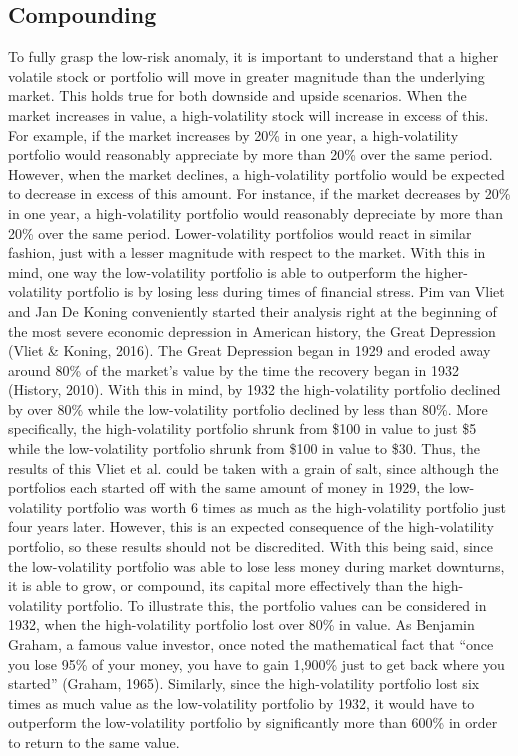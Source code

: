 \documentclass[12pt,twoside]{reedthesis}
\theoremstyle{definition}
\theoremstyle{definition}
\theoremstyle{definition}
\theoremstyle{remark}
\begin{document}
\subsection{Compounding}\label{compounding}

To fully grasp the low-risk anomaly, it is important to understand that
a higher volatile stock or portfolio will move in greater magnitude than
the underlying market. This holds true for both downside and upside
scenarios. When the market increases in value, a high-volatility stock
will increase in excess of this. For example, if the market increases by
20\% in one year, a high-volatility portfolio would reasonably
appreciate by more than 20\% over the same period. However, when the
market declines, a high-volatility portfolio would be expected to
decrease in excess of this amount. For instance, if the market decreases
by 20\% in one year, a high-volatility portfolio would reasonably
depreciate by more than 20\% over the same period. Lower-volatility
portfolios would react in similar fashion, just with a lesser magnitude
with respect to the market. With this in mind, one way the
low-volatility portfolio is able to outperform the higher-volatility
portfolio is by losing less during times of financial stress. Pim van
Vliet and Jan De Koning conveniently started their analysis right at the
beginning of the most severe economic depression in American history,
the Great Depression (Vliet \& Koning, 2016). The Great Depression began
in 1929 and eroded away around 80\% of the market's value by the time
the recovery began in 1932 (History, 2010). With this in mind, by 1932
the high-volatility portfolio declined by over 80\% while the
low-volatility portfolio declined by less than 80\%. More specifically,
the high-volatility portfolio shrunk from \$100 in value to just \$5
while the low-volatility portfolio shrunk from \$100 in value to \$30.
Thus, the results of this Vliet et al. could be taken with a grain of
salt, since although the portfolios each started off with the same
amount of money in 1929, the low-volatility portfolio was worth 6 times
as much as the high-volatility portfolio just four years later. However,
this is an expected consequence of the high-volatility portfolio, so
these results should not be discredited. With this being said, since the
low-volatility portfolio was able to lose less money during market
downturns, it is able to grow, or compound, its capital more effectively
than the high-volatility portfolio. To illustrate this, the portfolio
values can be considered in 1932, when the high-volatility portfolio
lost over 80\% in value. As Benjamin Graham, a famous value investor,
once noted the mathematical fact that ``once you lose 95\% of your
money, you have to gain 1,900\% just to get back where you started''
(Graham, 1965). Similarly, since the high-volatility portfolio lost six
times as much value as the low-volatility portfolio by 1932, it would
have to outperform the low-volatility portfolio by significantly more
than 600\% in order to return to the same value.
\end{document}
